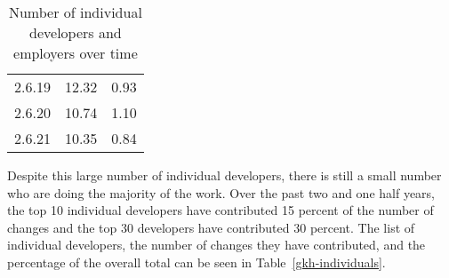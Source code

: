 \documentclass[final]{ols}
\begin{document}
\begin{table}
\begin{center}
\begin{tabular}{|r|r|r|}
2.6.19	& 12.32\hspace{3ex}	& 0.93\hspace{3ex}	\\
2.6.20	& 10.74\hspace{3ex}	& 1.10\hspace{3ex}	\\
2.6.21	& 10.35\hspace{3ex}	& 0.84\hspace{3ex}	\\
\hline
\end{tabular}
\caption{Number of individual developers and employers over time}
\label{gkh-num-developers-over-time}
\end{center}
\end{table}

Despite this large number of individual developers, there is still a
small number who are doing the majority of the work.  Over the past two
and one half years, the top 10 individual developers have contributed
15 percent of the number of changes and the top 30 developers have
contributed 30 percent.  The list of individual developers, the number
of changes they have contributed, and the percentage of the overall
total can be seen in Table~\ref{gkh-individuals}.
\end{document}
